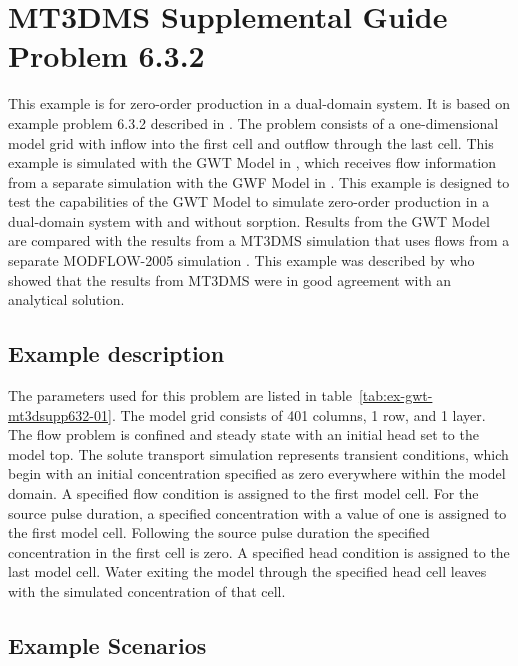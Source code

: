 \section{MT3DMS Supplemental Guide Problem 6.3.2}

This example is for zero-order production in a dual-domain system.  It is based on example problem 6.3.2 described in \cite{zheng2010mt3dmsv5.3}.  The problem consists of a one-dimensional model grid with inflow into the first cell and outflow through the last cell.  This example is simulated with the GWT Model in \mf, which receives flow information from a separate simulation with the GWF Model in \mf.  This example is designed to test the capabilities of the GWT Model to simulate zero-order production in a dual-domain system with and without sorption.  Results from the GWT Model are compared with the results from a MT3DMS simulation \citep{zheng1990mt3d} that uses flows from a separate MODFLOW-2005 simulation \citep{modflow2005}.  This example was described by \cite{zheng2010mt3dmsv5.3} who showed that the results from MT3DMS were in good agreement with an analytical solution.

\subsection{Example description}

The parameters used for this problem are listed in table~\ref{tab:ex-gwt-mt3dsupp632-01}.  The model grid consists of 401 columns, 1 row, and 1 layer.  The flow problem is confined and steady state with an initial head set to the model top.  The solute transport simulation represents transient conditions, which begin with an initial concentration specified as zero everywhere within the model domain.  A specified flow condition is assigned to the first model cell.  For the source pulse duration, a specified concentration with a value of one is assigned to the first model cell.  Following the source pulse duration the specified concentration in the first cell is zero.  A specified head condition is assigned to the last model cell.  Water exiting the model through the specified head cell leaves with the simulated concentration of that cell.



\subsection{Example Scenarios}

